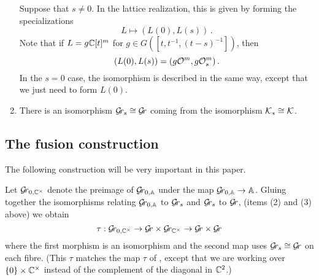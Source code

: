\documentclass[draft]{article}
\begin{document}
\begin{enumerate}
    Suppose that $ s \ne 0 $.  In the lattice realization, this is given by forming the specializations 
    $$
    L \mapsto (L(0), L(s))\,.
    $$
    Note that if $ L = g \mathbb C[t]^m$ for $ g \in G([t,t^{-1}, (t-s)^{-1}])$, then 
    $$
        (L(0), L(s)) = (g \mathcal O^m, g\mathcal O^m_s)\,. 
    $$
% 
% 
    In the $ s = 0 $ case, the isomorphism is described in the same way, except that we just need to form $ L(0)$.
    \item There is an isomorphism $ \mathcal{G}\!r_s \cong \mathcal{G}\!r $ coming from the isomorphism $ \mathcal K_s \cong \mathcal K$. 
\end{enumerate}

\subsection{The fusion construction}
The following construction will be very important in this paper.  

Let $ \mathcal{G}\!r_{0, \mathbb C^\times} $ denote the preimage of $ \mathcal{G}\!r_{0, \mathbb A} $ under the map $\mathcal{G}\!r_{0,\mathbb A} \rightarrow \mathbb A $.  Gluing together the isomorphisms relating ${\mathcal{G}\!r_{0,\mathbb A}}$ to $\mathcal{G}\!r_s$ and $\mathcal{G}\!r_s$ to $\mathcal{G}\!r$, (items (2) and (3) above) we obtain
$$
\tau : \mathcal{G}\!r_{0, \mathbb C^\times} \rightarrow \mathcal{G}\!r \times \mathcal{G}\!r_{\mathbb C^\times} \rightarrow \mathcal{G}\!r \times \mathcal{G}\!r
$$
where the first morphism is an isomorphism and the second map uses $ \mathcal{G}\!r_s \cong \mathcal{G}\!r $ on each fibre.  (This $\tau$ matches the map $ \tau $ of \cite{mirkovic2007geometric}, except that we are working over $ \{0 \} \times \mathbb C^\times$ instead of the complement of the diagonal in $ \mathbb C^2 $.)
\end{document}
